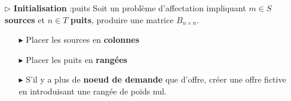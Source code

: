 \documentclass{report}
\begin{document}
\begin{multicols*}{2}
\begin{itemize}
    \item [$\rhd$ ] \textbf{Initialisation} :puits
        Soit un problème d'affectation impliquant $m \in S$ 
        \textbf{sources}  et $n \in T$ \textbf{puits}, produire 
        une matrice $B_{n \times n}$. 
        \begin{itemize}
            \item [$\blacktriangleright$ ] Placer les sources 
                en \textbf{colonnes}  
            \item [$\blacktriangleright$ ] Placer les puits 
                en \textbf{rangées}   
            \item [$\blacktriangleright$ ] S'il y a plus de \textbf{noeud de demande}
                que d'offre, créer une offre fictive en introduisant 
                une rangée de poids nul. 
        \end{itemize}
\end{itemize}


\end{multicols*}
\end{document}
